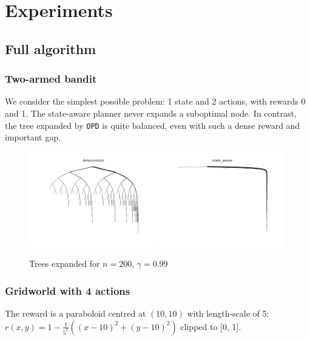 \documentclass{article}
\begin{document}
\section{Experiments}

\subsection{Full algorithm}

\subsubsection{Two-armed bandit}

We consider the simplest possible problem: 1 state and 2 actions, with rewards 0 and 1. The state-aware planner never expands a suboptimal node. In contrast, the tree expanded by \texttt{OPD} is quite balanced, even with such a dense reward and important gap.
\begin{figure}[H]
    \centering
    \includegraphics[width=0.49\textwidth]{img/bandit_deterministic.pdf}
    \includegraphics[width=0.49\textwidth]{img/bandit_state_aware.pdf}
    \caption{Trees expanded for $n = 200$, $\gamma=0.99$}
    \label{fig:bandit_trees}
\end{figure}

\subsubsection{Gridworld with 4 actions}

The reward is a paraboloid centred at $(10, 10)$ with length-scale of 5:  $r(x, y) = 1 - \frac{1}{5^2}((x-10)^2 + (y-10)^2)$ clipped to [0, 1].
\end{document}
